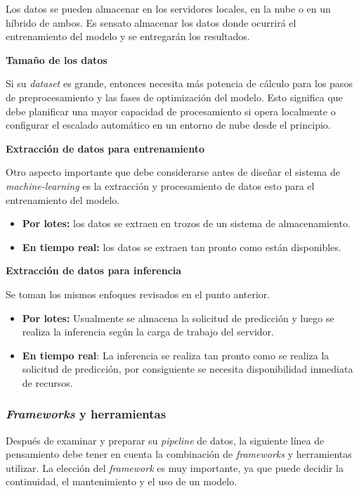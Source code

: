 \documentclass[a4paper,12pt]{article}
\begin{document}
		Los datos se pueden almacenar en los servidores locales, en la nube o en un híbrido de ambos. Es sensato almacenar los datos donde ocurrirá el entrenamiento del modelo y se entregarán los resultados.
				
		\textbf{Tamaño de los datos}
				
		Si su \textit{dataset} es grande, entonces necesita más potencia de cálculo para los pasos de preprocesamiento y las fases de optimización del modelo. Esto significa que debe planificar una mayor capacidad de procesamiento si opera localmente o configurar el escalado automático en un entorno de nube desde el principio.
				
		\textbf{Extracción de datos para entrenamiento}
				
		Otro aspecto importante que debe considerarse antes de diseñar el sistema de \textit{machine-learning} es la extracción y procesamiento de datos esto para el entrenamiento del modelo.
		\begin{itemize}[noitemsep, topsep=2pt]
			\item \textbf{Por lotes:} los datos se extraen en trozos de un sistema de almacenamiento. 
			\item \textbf{En tiempo real:} los datos se extraen tan pronto como están disponibles. 
		\end{itemize}
				
		\textbf{Extracción de datos para inferencia}
				
		Se toman los mismos enfoques revisados en el punto anterior.
		\begin{itemize}[noitemsep, topsep=2pt]
			\item \textbf{Por lotes:} Usualmente se almacena la solicitud de predicción y luego se realiza la inferencia según la carga de trabajo del servidor.
			\item \textbf{En tiempo real}: La inferencia se realiza tan pronto como se realiza la solicitud de predicción, por consiguiente se necesita disponibilidad inmediata de recursos.
		\end{itemize}
				
		\subsubsection{\textit{Frameworks} y herramientas}
				
		Después de examinar y preparar su \textit{pipeline} de datos, la siguiente línea de pensamiento debe tener en cuenta la combinación de \textit{frameworks} y herramientas utilizar. La elección del \textit{framework} es muy importante, ya que puede decidir la continuidad, el mantenimiento y el uso de un modelo.
				
\end{document}
